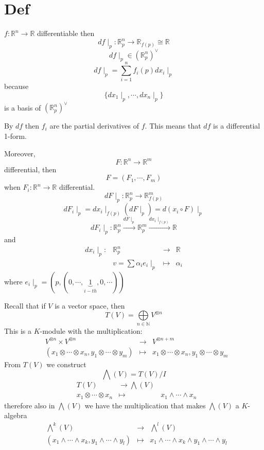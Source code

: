 \documentclass{book}
\begin{document}
\section{Def}
$f:\mathbb{R}^n\rightarrow \mathbb{R}$ differentiable then$$df\mid_p:\mathbb{R}^n_p\rightarrow \mathbb{R}_{f(p)}\cong\mathbb{R}$$$$df\mid_p\in (\mathbb{R}^n_p)^\vee$$$$df\mid_p=\sum\limits_{i=1}^nf_i(p)dx_i\mid_p$$
because$$\{dx_1\mid_p,\cdots,dx_n\mid_p\}$$ is a basis of $(\mathbb{R}^n_p)^\vee$

By $df$ then $f_i$ are the partial derivatives of $f$. This means that $df$ is a differential 1-form.

Moreover, $$F:\mathbb{R}^n\rightarrow \mathbb{R}^m$$ differential, then
$$F=(F_1,\cdots,F_m)$$ when $F_i:\mathbb{R}^n\rightarrow\mathbb{R}$ differential.
$$dF\mid_p:\mathbb{R}^n_p\rightarrow\mathbb{R}_{f(p)}^m$$
$$dF_i\mid_p=dx_i\mid_{f(p)}(dF\mid_p)=d(x_i\circ F)\mid_p$$
$$dF_i\mid_p:\mathbb{R}^n_p\stackrel{dF\mid_p}\rightarrow\mathbb{R}^m_p\stackrel{dx_i\mid_{f(p)}}\rightarrow\mathbb{R}$$
and $$\begin{aligned}
    dx_i\mid_p: &\mathbb{R}^n_p&\rightarrow&\mathbb{R}\\ &v=\sum\alpha_ie_i\mid_p&\mapsto &\alpha_i
\end{aligned}$$
where $e_i\mid_p=(p,(0,\cdots,\underbrace{1}\limits_{i-th},0,\cdots))$

Recall that if $V$ is a vector space, then $$T(V)=\bigoplus\limits_{n\in \mathbb{N}}V^{\otimes n}$$ This is a $K$-module with the multiplication:
$$\begin{aligned}
    &V^{\otimes n}\times V^{\otimes n}&\rightarrow &V^{\otimes n+m}\\
    &(x_1\otimes\cdots\otimes x_n,y_1\otimes\cdots\otimes y_m)&\mapsto &x_1\otimes\cdots\otimes x_n,y_1\otimes\cdots\otimes y_m
\end{aligned}$$
From $T(V)$ we construct$$\bigwedge(V)=T(V)/I$$$$\begin{aligned}
    &T(V)&\rightarrow\bigwedge(V)\\
    &x_1\otimes\cdots\otimes x_n&\mapsto &x_1\wedge\cdots\wedge x_n
\end{aligned}$$
therefore also in $\bigwedge(V)$ we have the multiplication that makes $\bigwedge(V)$ a $K$-algebra
$$\begin{aligned}
    &\bigwedge\limits^k(V)&\rightarrow &\bigwedge\limits^l(V)\\
    &(x_1\wedge\cdots\wedge x_k, y_1\wedge\cdots\wedge y_l)&\mapsto &x_1\wedge\cdots\wedge x_k\wedge y_1\wedge\cdots\wedge y_l
\end{aligned}$$
\end{document}
